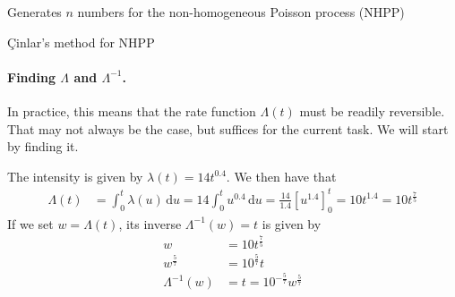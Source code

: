 \documentclass[a4paper,english,12pt]{article}
\begin{document}
\begin{algorithm}
  \caption{Generates $n$ numbers for the non-homogeneous Poisson process (NHPP)}
  \label{algorithm:nhpp}
  \begin{algorithmic}[1]
       
      \State {}
    \EndFunction
      \EndFor
      \State {}
    \EndFunction
  \end{algorithmic}
\end{algorithm}

\begin{algorithm}
  \caption{Çinlar's method for NHPP}
  \label{algorithm:cinlar}
  \begin{algorithmic}[1]
         
      \EndFor
      \State {}
    \EndFunction
  \end{algorithmic}
\end{algorithm}

\paragraph{Finding $\Lambda$ and $\Lambda^{-1}$.}
In practice, this means that the rate function $\Lambda(t)$ must be readily
reversible. That may not always be the case, but suffices for the current task.
We will start by finding it.

The intensity is given by $\lambda(t) = 14t^{0.4}$. We then have that
\begin{align*}
  \Lambda(t) &= \int_0^t{\lambda(u)}\, \textrm{d}u
    =  14\int_0^t{u^{0.4}}\, \textrm{d}u
    = \frac{14}{1.4}\left[ u^{1.4} \right]_0^t = 10t^{1.4} = 10t^{\frac{7}{5}}
\end{align*}
If we set $w = \Lambda(t)$, its inverse $\Lambda^{-1}(w) = t$ is given by
\begin{align*}
  w &= 10t^{\frac{7}{5}} \\
  w^{\frac{5}{7}} &= 10^{\frac{5}{7}}t \\
  \Lambda^{-1}(w) &= t = 10^{-\frac{5}{7}} w^{\frac{5}{7}}
\end{align*}
\end{document}

